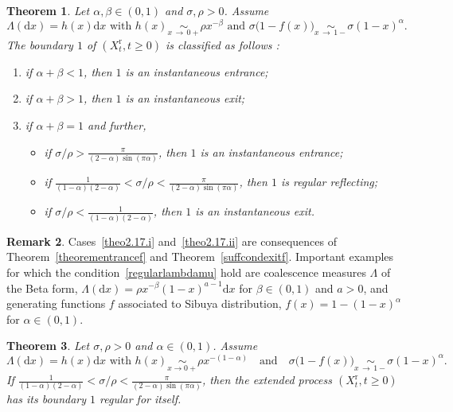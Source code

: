 \documentclass[10pt]{amsart}
\newtheorem{theo}{Theorem}[section]
\theoremstyle{definition}\newtheorem{defi}[theo]{Definition}\newtheorem{rema}[theo]{Remark}\newtheorem{exam}[theo]{Example}\newtheorem{exem}[theo]{Example}\newtheorem{nota}[theo]{Notation}
\newcommand{\ddr}{\mathrm{d}}
\newcommand{\rmr}{\mathrm{r}}
\newcommand*{\romanenumi}{\renewcommand*{\theenumi}{\roman{enumi}}}
\begin{document}
\begin{theo}\label{regularcase}
Let $\alpha,\beta\in (0,1)$ and $\sigma,\rho>0$. Assume
\begin{equation}\label{regularlambdamu}
\Lambda(\ddr x)=h(x)\ddr x \text{ with } h(x)\underset{x\,\rightarrow\,0+}{\sim}\rho x^{-\beta} \text{ and } \sigma \big(1-f(x)\big)\underset{x\,\rightarrow\,1-}{\sim} \sigma (1-x)^{\alpha}.
\end{equation}
The boundary $1$ of $(X_t^{\rmr},t\geq 0)$ is classified as follows :
\begin{enumerate}\romanenumi
\item \label{theo2.17.i}if $\alpha+\beta<1$, then $1$ is an instantaneous entrance;
\vspace*{1mm}
\item\label{theo2.17.ii} if $\alpha+\beta>1$, then $1$ is an instantaneous exit;
\vspace*{1mm}
\item\label{theo2.17.iii} if $\alpha+\beta=1$ and further,
\vspace*{2mm}
\begin{itemize}
\item if $\sigma/\rho>\frac{\pi}{(2-\alpha)\sin(\pi \alpha)}$, then $1$ is an instantaneous entrance;
\vspace*{2mm}
\item if $\frac{1}{(1-\alpha)(2-\alpha)}<\sigma/\rho<\frac{\pi}{(2-\alpha)\sin(\pi \alpha)}$, then $1$ is regular reflecting;
\vspace*{2mm}
\item if $\sigma/\rho<\frac{1}{(1-\alpha)(2-\alpha)}$, then $1$ is an instantaneous exit.
\end{itemize}
\end{enumerate}
\end{theo}

\begin{rema}
Cases~\eqref{theo2.17.i} and~\eqref{theo2.17.ii} are consequences of Theorem~\ref{theorementrancef} and Theorem~\ref{suffcondexitf}. Important examples for which the condition~\eqref{regularlambdamu} hold are coalescence measures $\Lambda$ of the Beta form, $\Lambda(\ddr x)=\rho x^{-\beta}(1-x)^{a-1} \ddr x$ for $\beta\in (0,1)$ and $a>0$, and generating functions $f$ associated to Sibuya distribution, $f(x)=1-(1-x)^{\alpha}$ for $\alpha\in (0,1)$.
\end{rema}

\begin{theo}\label{regularforitselfstable}
Let $\sigma,\rho>0$ and $\alpha \in (0,1)$.
Assume 
\[
\Lambda(\ddr x)=h(x)\ddr x \text{ with } h(x)\underset{x\rightarrow 0+}{\sim}\rho x^{-(1-\alpha)}
\quad
\text{and} 
\quad
\sigma\big(1-f(x)\big)\underset{x\,\rightarrow\,1-}{\sim} \sigma (1-x)^{\alpha}.
\]
If $\frac{1}{(1-\alpha)(2-\alpha)}<\sigma/\rho<\frac{\pi}{(2-\alpha)\sin(\pi \alpha)}$, then the extended process $(X_t^{\rmr},t\geq 0)$ has its boundary $1$ regular for itself.
\end{theo}
\end{document}
